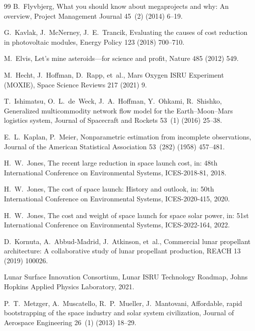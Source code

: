 \documentclass[5p,twocolumn]{elsarticle}
\begin{document}
\begin{thebibliography}{99}
B.~Flyvbjerg,
\newblock What you should know about megaprojects and why: An overview,
\newblock Project Management Journal 45~(2) (2014) 6--19.

G.~Kavlak, J.~McNerney, J.~E.~Trancik,
\newblock Evaluating the causes of cost reduction in photovoltaic modules,
\newblock Energy Policy 123 (2018) 700--710.

M.~Elvis,
\newblock Let's mine asteroids---for science and profit,
\newblock Nature 485 (2012) 549.

M.~Hecht, J.~Hoffman, D.~Rapp, et~al.,
\newblock Mars Oxygen ISRU Experiment (MOXIE),
\newblock Space Science Reviews 217 (2021) 9.

T.~Ishimatsu, O.~L.~de~Weck, J.~A.~Hoffman, Y.~Ohkami, R.~Shishko,
\newblock Generalized multicommodity network flow model for the Earth--Moon--Mars logistics system,
\newblock Journal of Spacecraft and Rockets 53~(1) (2016) 25--38.

E.~L.~Kaplan, P.~Meier,
\newblock Nonparametric estimation from incomplete observations,
\newblock Journal of the American Statistical Association 53~(282) (1958) 457--481.

H.~W.~Jones,
\newblock The recent large reduction in space launch cost,
\newblock in: 48th International Conference on Environmental Systems, ICES-2018-81, 2018.

H.~W.~Jones,
\newblock The cost of space launch: History and outlook,
\newblock in: 50th International Conference on Environmental Systems, ICES-2020-415, 2020.

H.~W.~Jones,
\newblock The cost and weight of space launch for space solar power,
\newblock in: 51st International Conference on Environmental Systems, ICES-2022-164, 2022.

D.~Kornuta, A.~Abbud-Madrid, J.~Atkinson, et~al.,
\newblock Commercial lunar propellant architecture: A collaborative study of lunar propellant production,
\newblock REACH 13 (2019) 100026.

Lunar Surface Innovation Consortium,
\newblock Lunar ISRU Technology Roadmap,
\newblock Johns Hopkins Applied Physics Laboratory, 2021.

P.~T.~Metzger, A.~Muscatello, R.~P.~Mueller, J.~Mantovani,
\newblock Affordable, rapid bootstrapping of the space industry and solar system civilization,
\newblock Journal of Aerospace Engineering 26~(1) (2013) 18--29.


\end{thebibliography}
\end{document}
